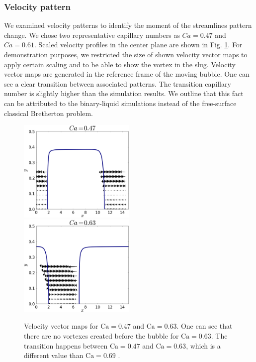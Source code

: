 \documentclass{CFD2011}
\newcommand{\Ca}{\mathrm{Ca}}
\begin{document}
\subsubsection{Velocity pattern}
We examined velocity patterns to identify the moment of the streamlines pattern change. We chose two
representative capillary numbers as $Ca=0.47$ and $Ca=0.61$. Scaled velocity profiles in the center
plane are shown  in Fig. \ref{fig:streamlines:pattern}. For demonstration purposes, we restricted
the size of shown velocity vector maps to apply certain scaling and to be able to show the vortex in
the slug. Velocity vector maps are generated in the reference frame of the moving bubble. One can
see a clear transition between associated patterns. The transition capillary number
\cite{heil-threedim} is slightly higher than the simulation results. We outline that this fact can
be
attributed to the binary-liquid simulations instead of the free-surface classical Bretherton
problem. 
\begin{figure}[!]
\includegraphics[width=0.5\textwidth]{Figures/vortex_ca47_png.eps}\\
\includegraphics[width=0.5\textwidth]{Figures/vortex_ca63_png.eps}\\
\caption{Velocity vector maps for $\Ca=0.47$ and $\Ca=0.63$. One can see that there are no vortexes
created
before the bubble for $\Ca=0.63$. The transition happens between $\Ca=0.47$ and $\Ca=0.63$, which
is a different value than $\Ca=0.69$ \cite{heil-threedim}. \label{fig:streamlines:pattern}}
\end{figure}
\end{document}

